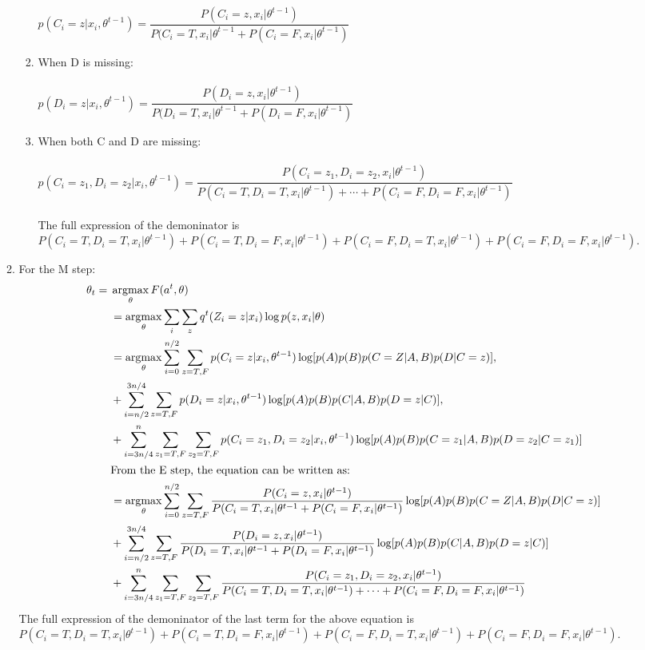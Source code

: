 \documentclass[english]{article}
\newcommand{\argmax}{\operatornamewithlimits{argmax}}
\begin{document}
\begin{enumerate}
\begin{enumerate}
\begin{enumerate}
            $p(C_i = z | x_i, \theta^{t-1}) = \dfrac{P(C_i = z, x_i | \theta^{t-1})}{P(C_i =T, x_i |\theta^{t-1} + P(C_i =F, x_i |\theta^{t-1})}$\\
            \item When D is missing:\\\\
            $p(D_i = z | x_i, \theta^{t-1}) = \dfrac{P(D_i = z, x_i | \theta^{t-1})}{P(D_i =T, x_i |\theta^{t-1} + P(D_i =F, x_i |\theta^{t-1})}$\\
            \item When both C and D are missing:\\\\
            $p(C_i = z_1, D_i = z_2 | x_i, \theta^{t-1}) = \dfrac{P(C_i = z_1, D_i = z_2, x_i | \theta^{t-1})}{P(C_i = T, D_i = T, x_i|\theta^{t-1})+\cdots+P(C_i = F, D_i = F, x_i|\theta^{t-1})}$\\\\
            The full expression of the demoninator is $P(C_i = T, D_i = T, x_i|\theta^{t-1})+P(C_i = T, D_i = F, x_i|\theta^{t-1})+P(C_i = F, D_i = T, x_i|\theta^{t-1})+P(C_i = F, D_i = F, x_i|\theta^{t-1})$.
        \end{enumerate}
        \item For the M step:\\
        \begin{align*}
        \theta_t = &\; \argmax_\theta F(a^t, \theta)\\
    &\; = \argmax_\theta \sum_i \sum_z q^t(Z_i = z|x_i)\log p(z,x_i|\theta)\\
    &\; = \argmax_\theta \sum_{i=0}^{n/2} \sum_{z=T, F} p(C_i = z|x_i, \theta^{t-1})\log [p(A)p(B)p(C=Z|A,B)p(D|C=z)],\\
    &\; +  \sum_{i=n/2}^{3n/4} \sum_{z=T, F} p(D_i = z|x_i, \theta^{t-1})\log [p(A)p(B)p(C|A,B)p(D=z|C)],\\
    &\; +  \sum_{i=3n/4}^{n} \sum_{z_1=T, F} \sum_{z_2 = T, F} p(C_i = z_1, D_i = z_2 |x_i, \theta^{t-1})\log [p(A)p(B)p(C=z_1|A,B)p(D=z_2 | C=z_1)] \\
    &\; \textrm{From the E step, the equation can be written as:}\\
    &\; = \argmax_\theta \sum_{i=0}^{n/2} \sum_{z=T, F} \dfrac{P(C_i = z, x_i | \theta^{t-1})}{P(C_i =T, x_i |\theta^{t-1} + P(C_i =F, x_i |\theta^{t-1})} \log [p(A)p(B)p(C=Z|A,B)p(D|C=z)]\\
    &\; + \sum_{i=n/2}^{3n/4} \sum_{z=T, F} \dfrac{P(D_i = z, x_i | \theta^{t-1})}{P(D_i =T, x_i |\theta^{t-1} + P(D_i =F, x_i |\theta^{t-1})} \log [p(A)p(B)p(C|A,B)p(D=z|C)]\\
    &\; + \sum_{i=3n/4}^{n} \sum_{z_1=T, F} \sum_{z_2 = T, F} \dfrac{P(C_i = z_1, D_i = z_2, x_i | \theta^{t-1})}{P(C_i = T, D_i = T, x_i|\theta^{t-1})+\cdots+P(C_i = F, D_i = F, x_i|\theta^{t-1})}
        \end{align*}
        The full expression of the demoninator of the last term for the above equation is $P(C_i = T, D_i = T, x_i|\theta^{t-1})+P(C_i = T, D_i = F, x_i|\theta^{t-1})+P(C_i = F, D_i = T, x_i|\theta^{t-1})+P(C_i = F, D_i = F, x_i|\theta^{t-1})$.
    \end{enumerate}
\end{enumerate}
\end{document}
